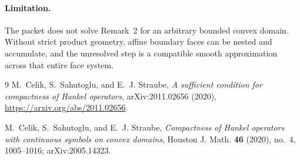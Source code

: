 \documentclass[11pt]{article}
\begin{document}
\paragraph{Limitation.}
The packet does not solve Remark~2 for an arbitrary bounded convex domain.
Without strict product geometry, affine boundary faces can be nested and
accumulate, and the unresolved step is a compatible smooth approximation
across that entire face system.

\begin{thebibliography}{9}
M.~Celik, S.~Sahutoglu, and E.~J. Straube,
\emph{A sufficient condition for compactness of Hankel operators},
arXiv:2011.02656 (2020),
\url{https://arxiv.org/abs/2011.02656}.

M.~Celik, S.~Sahutoglu, and E.~J. Straube,
\emph{Compactness of Hankel operators with continuous symbols on convex
domains}, Houston J. Math. \textbf{46} (2020), no.~4, 1005--1016;
arXiv:2005.14323.
\end{thebibliography}
\end{document}
